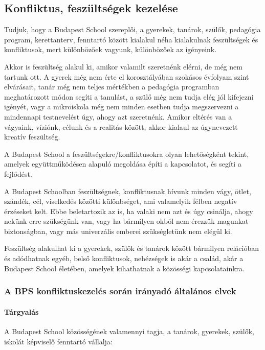 \subsection{Konfliktus, feszültségek kezelése}
Tudjuk, hogy a Budapest School szereplői, a gyerekek, tanárok, szülők,
pedagógia program, kerettanterv, fenntartó között kialakul néha
kialakulnak feszültségek és konfliktusok, mert különbözőek vagyunk,
különbözőek az igényeink.

Akkor is feszültség alakul ki, amikor valamilt szeretnénk elérni, de még
nem tartunk ott. A gyerek még nem érte el korosztályában szokásos
évfolyam szint elvárásait, tanár még nem teljes mértékben a pedagógia
programban meghatározott módon segíti a tanulást, a szülő még nem tudja
elég jól kifejezni igényét, vagy a mikroiskola még nem minden esetben
tudja megszervezni a mindennapi testnevelést úgy, ahogy azt szeretnénk.
Amikor eltérés van a vágyaink, víziónk, célunk és a realitás között,
akkor kialaul az úgynevezett kreatív feszültség.

A Budapest School a feszültségekre/konfliktusokra olyan lehetőségként
tekint, amelyek együttműködésen alapuló megoldása építi a kapcsolatot,
és segíti a fejlődést.

A Budapest Schoolban feszültségnek, konfliktusnak hívunk minden vágy,
ötlet, szándék, cél, viselkedés közötti különbséget, ami valamelyik
félben negatív érzéseket kelt. Ebbe beletartozik az is, ha valaki nem
azt és úgy csinálja, ahogy nekünk erre szükségünk van, vagy ha bármilyen
okból nem érezzük magunkat biztonságban, vagy más univerzális emberei
szükségletünk nem elégül ki.

Feszültség alakulhat ki a gyerekek, szülők és tanárok között bármilyen
relációban és adódhatnak egyéb, belső konfliktusok, nehézségek is akár a
család, akár a Budapest School életében, amelyek kihathatnak a közösségi
kapcsolatainkra.

\subsubsection{A BPS konfliktuskezelés során irányadó általános elvek}

\paragraph{Tárgyalás}\label{tuxe1rgyaluxe1s}

A Budapest School közösségének valamennyi tagja, a tanárok, gyerekek,
szülők, iskolát képviselő fenntartó vállalja:

